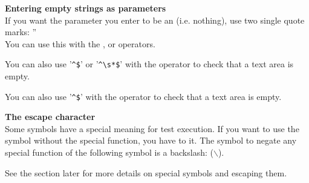 
\textbf{Entering empty strings as parameters}\\
If you want the parameter you enter to be an  (i.e. nothing), use two single quote marks: ''\\

You can use this with the ,  or  operators.

You can also use '\verb+^$+' or '\verb+^\s*$+' with the operator  to check that a text area is empty.  

You can also use '\verb+^$+' with the operator  to check that a text area is empty.  


\textbf{The escape character}\\
Some symbols have a special meaning for test execution. If you want to use the symbol without the special function, you have to  it. The symbol to negate any special function of the following symbol is a backslash: ($\backslash$). 
                          
See the section later  for more details on special symbols and escaping them.


